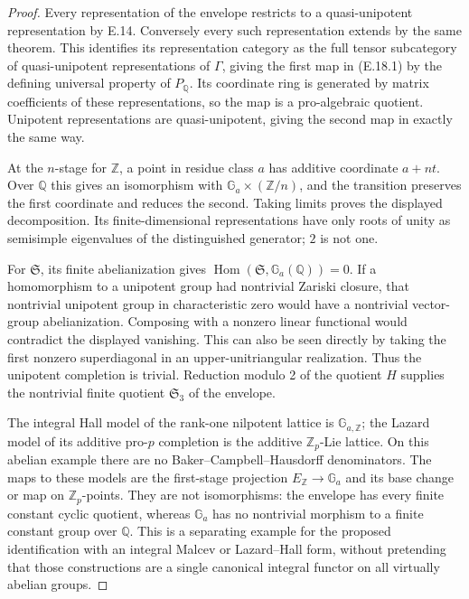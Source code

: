 \begin{proof}
Every representation of the envelope restricts to a
quasi-unipotent representation by E.14.  Conversely every such
representation extends by the same theorem.  This identifies
its representation category as the full tensor subcategory of
quasi-unipotent representations of \(\Gamma\), giving the first
map in (E.18.1) by the defining universal property of
\(P_{\mathbb Q}\).  Its coordinate ring is generated by matrix
coefficients of these representations, so the map is a
pro-algebraic quotient.  Unipotent representations are
quasi-unipotent, giving the second map in exactly the same way.

At the \(n\)-stage for \(\mathbb Z\), a point in residue class
\(a\) has additive coordinate \(a+nt\).  Over \(\mathbb Q\)
this gives an isomorphism with
\(\mathbb G_a\times(\mathbb Z/n)\), and the transition preserves
the first coordinate and reduces the second.  Taking limits
proves the displayed decomposition.  Its finite-dimensional
representations have only roots of unity as semisimple
eigenvalues of the distinguished generator; \(2\) is not one.

For \(\mathfrak S\), its finite abelianization gives
\(\operatorname{Hom}(\mathfrak S,\mathbb G_a(\mathbb Q))=0\).
If a homomorphism to a unipotent group had nontrivial Zariski
closure, that nontrivial unipotent group in characteristic zero
would have a nontrivial vector-group abelianization.  Composing
with a nonzero linear functional would contradict the displayed
vanishing.  This can also be seen directly by taking the first
nonzero superdiagonal in an upper-unitriangular realization.
Thus the unipotent completion is trivial.  Reduction modulo 2
of the quotient \(H\) supplies the nontrivial finite quotient
\(\mathfrak S_3\) of the envelope.

The integral Hall model of the rank-one nilpotent lattice is
\(\mathbb G_{a,\mathbb Z}\); the Lazard model of its additive
pro-\(p\) completion is the additive \(\mathbb Z_p\)-Lie lattice.
On this abelian example there are no Baker--Campbell--Hausdorff
denominators.  The maps to these models are the first-stage
projection \(E_{\mathbb Z}\to\mathbb G_a\) and its base change
or map on \(\mathbb Z_p\)-points.  They are not isomorphisms:
the envelope has every finite constant cyclic quotient, whereas
\(\mathbb G_a\) has no nontrivial morphism to a finite constant
group over \(\mathbb Q\).  This is a separating example for the
proposed identification with an integral Malcev or Lazard--Hall
form, without pretending that those constructions are a single
canonical integral functor on all virtually abelian groups.


\end{proof}
